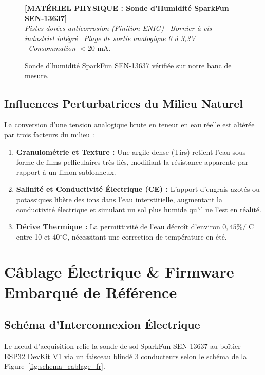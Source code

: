 \documentclass[11pt,a4paper,oneside]{report}
\begin{document}
\begin{figure}[h!]
\centering
\begin{tcolorbox}[enhanced,colback=white,colframe=nasablue,width=0.7\linewidth,arc=2mm]
\centering
\textbf{[MATÉRIEL PHYSIQUE : Sonde d'Humidité SparkFun SEN-13637]}\\[0.2cm]
\textit{Pistes dorées anticorrosion (Finition ENIG) \textbar\ Bornier à vis industriel intégré \textbar\ Plage de sortie analogique 0 à 3,3V \textbar\ Consommation $< 20\text{ mA}$.}
\end{tcolorbox}
\caption{Sonde d'humidité SparkFun SEN-13637 vérifiée sur notre banc de mesure.}
\label{fig:capteur_sparkfun}
\end{figure}

\section{Influences Perturbatrices du Milieu Naturel}
La conversion d'une tension analogique brute en teneur en eau réelle est altérée par trois facteurs du milieu :
\begin{enumerate}
    \item \textbf{Granulométrie et Texture :} Une argile dense (Tirs) retient l'eau sous forme de films pelliculaires très liés, modifiant la résistance apparente par rapport à un limon sablonneux.
    \item \textbf{Salinité et Conductivité Électrique (CE) :} L'apport d'engrais azotés ou potassiques libère des ions dans l'eau interstitielle, augmentant la conductivité électrique et simulant un sol plus humide qu'il ne l'est en réalité.
    \item \textbf{Dérive Thermique :} La permittivité de l'eau décroît d'environ $0,45\% / ^\circ\text{C}$ entre 10 et 40$^\circ$C, nécessitant une correction de température en été.
\end{enumerate}

\chapter{Câblage Électrique \& Firmware Embarqué de Référence}

\section{Schéma d'Interconnexion Électrique}
Le nœud d'acquisition relie la sonde de sol SparkFun SEN-13637 au boîtier ESP32 DevKit V1 via un faisceau blindé 3 conducteurs selon le schéma de la Figure~\ref{fig:schema_cablage_fr}.
\end{document}

